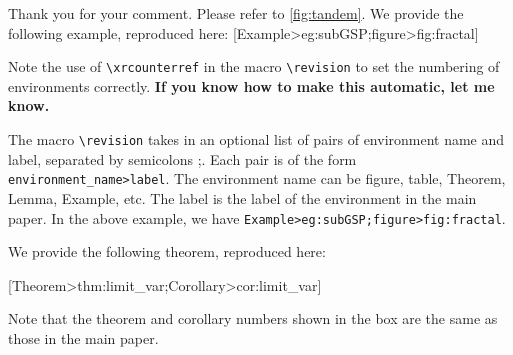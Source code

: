 \documentclass[11pt, onecolumn, final]{IEEEtran}
\begin{document}

\begin{response}
Thank you for your comment. Please refer to \cref{fig:tandem}. We provide the following example, reproduced here:   
[Example>eg:subGSP;figure>fig:fractal]

Note the use of \verb|\xrcounterref| in the macro \verb|\revision| to set the numbering of environments correctly. \textbf{If you know how to make this automatic, let me know.}

The macro \verb|\revision| takes in an optional list of pairs of environment name and label, separated by semicolons ;. Each pair is of the form \verb|environment_name>label|. The environment name can be figure, table, Theorem, Lemma, Example, etc. The label is the label of the environment in the main paper. In the above example, we have \verb|Example>eg:subGSP;figure>fig:fractal|.  
\end{response}

\begin{response}
We provide the following theorem, reproduced here:

[Theorem>thm:limit_var;Corollary>cor:limit_var]

Note that the theorem and corollary numbers shown in the box are the same as those in the main paper.
\end{response}
\end{document}
